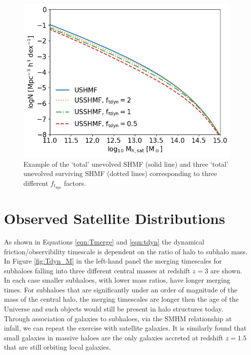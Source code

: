 \begin{figure}
	\centering
	\includegraphics[width = \linewidth]{Figures/Chapter3/SHMF.png}
	\caption{Example of the `total' unevolved SHMF (solid line) and three `total' unevolved surviving SHMF (dotted lines) corresponding to three different $f_{t_{dyn}}$ factors.}
	\label{fig:SHMF}
\end{figure}

\section{Observed Satellite Distributions}

As shown in Equations \ref{eqn:Tmerge} and \ref{eqn:tdyn} the dynamical friction/observibility timescale is dependent on the ratio of halo to subhalo mass. In Figure \ref{fig:Tdyn_M} in the left-hand panel the merging timescales for subhaloes falling into three different central masses at redshift $z=3$ are shown. In each case smaller subhaloes, with lower mass ratios, have longer merging times. For subhaloes that are significantly under an order of magnitude of the mass of the central halo, the merging timescales are longer then the age of the Universe and such objects would still be present in halo structures today. Through association of galaxies to subhaloes, via the SMHM relationship at infall, we can repeat the exercise with satellite galaxies. It is similarly found that small galaxies in massive haloes are the only galaxies accreted at redshift $z = 1.5$ that are still orbiting local galaxies.

